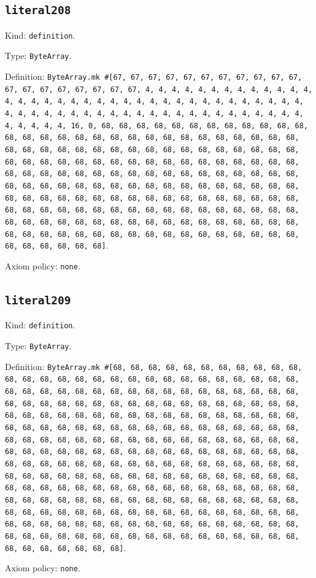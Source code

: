 \documentclass[11pt]{article}
\begin{document}
\subsection*{\texttt{literal208}}
\noindent Kind: \texttt{definition}.\par
\noindent Type: \texttt{ByteArray}.\par
\noindent Definition: \texttt{ByteArray.mk \#[67, 67, 67, 67, 67, 67, 67, 67, 67, 67, 67, 67, 67, 67, 67, 67, 67, 67, 67, 4, 4, 4, 4, 4, 4, 4, 4, 4, 4, 4, 4, 4, 4, 4, 4, 4, 4, 4, 4, 4, 4, 4, 4, 4, 4, 4, 4, 4, 4, 4, 4, 4, 4, 4, 4, 4, 4, 4, 4, 4, 4, 4, 4, 4, 4, 4, 4, 4, 4, 4, 4, 4, 4, 4, 4, 4, 4, 4, 4, 4, 4, 4, 4, 16, 0, 68, 68, 68, 68, 68, 68, 68, 68, 68, 68, 68, 68, 68, 68, 68, 68, 68, 68, 68, 68, 68, 68, 68, 68, 68, 68, 68, 68, 68, 68, 68, 68, 68, 68, 68, 68, 68, 68, 68, 68, 68, 68, 68, 68, 68, 68, 68, 68, 68, 68, 68, 68, 68, 68, 68, 68, 68, 68, 68, 68, 68, 68, 68, 68, 68, 68, 68, 68, 68, 68, 68, 68, 68, 68, 68, 68, 68, 68, 68, 68, 68, 68, 68, 68, 68, 68, 68, 68, 68, 68, 68, 68, 68, 68, 68, 68, 68, 68, 68, 68, 68, 68, 68, 68, 68, 68, 68, 68, 68, 68, 68, 68, 68, 68, 68, 68, 68, 68, 68, 68, 68, 68, 68, 68, 68, 68, 68, 68, 68, 68, 68, 68, 68, 68, 68, 68, 68, 68, 68, 68, 68, 68, 68, 68, 68, 68, 68, 68, 68, 68, 68, 68, 68, 68, 68, 68, 68, 68, 68, 68, 68, 68, 68, 68, 68, 68, 68, 68, 68, 68, 68]}.\par
\noindent Axiom policy: \texttt{none}.\par
\subsection*{\texttt{literal209}}
\noindent Kind: \texttt{definition}.\par
\noindent Type: \texttt{ByteArray}.\par
\noindent Definition: \texttt{ByteArray.mk \#[68, 68, 68, 68, 68, 68, 68, 68, 68, 68, 68, 68, 68, 68, 68, 68, 68, 68, 68, 68, 68, 68, 68, 68, 68, 68, 68, 68, 68, 68, 68, 68, 68, 68, 68, 68, 68, 68, 68, 68, 68, 68, 68, 68, 68, 68, 68, 68, 68, 68, 68, 68, 68, 68, 68, 68, 68, 68, 68, 68, 68, 68, 68, 68, 68, 68, 68, 68, 68, 68, 68, 68, 68, 68, 68, 68, 68, 68, 68, 68, 68, 68, 68, 68, 68, 68, 68, 68, 68, 68, 68, 68, 68, 68, 68, 68, 68, 68, 68, 68, 68, 68, 68, 68, 68, 68, 68, 68, 68, 68, 68, 68, 68, 68, 68, 68, 68, 68, 68, 68, 68, 68, 68, 68, 68, 68, 68, 68, 68, 68, 68, 68, 68, 68, 68, 68, 68, 68, 68, 68, 68, 68, 68, 68, 68, 68, 68, 68, 68, 68, 68, 68, 68, 68, 68, 68, 68, 68, 68, 68, 68, 68, 68, 68, 68, 68, 68, 68, 68, 68, 68, 68, 68, 68, 68, 68, 68, 68, 68, 68, 68, 68, 68, 68, 68, 68, 68, 68, 68, 68, 68, 68, 68, 68, 68, 68, 68, 68, 68, 68, 68, 68, 68, 68, 68, 68, 68, 68, 68, 68, 68, 68, 68, 68, 68, 68, 68, 68, 68, 68, 68, 68, 68, 68, 68, 68, 68, 68, 68, 68, 68, 68, 68, 68, 68, 68, 68, 68, 68, 68, 68, 68, 68, 68, 68, 68, 68, 68, 68, 68, 68, 68, 68, 68, 68, 68]}.\par
\noindent Axiom policy: \texttt{none}.\par
\end{document}
